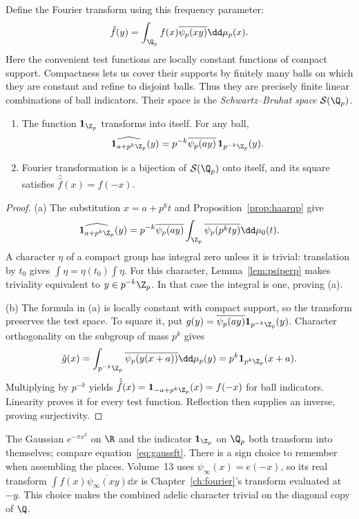Define the Fourier transform using this frequency parameter:
\[\hat f(y)=\int_{\Q_p}f(x)\overline{\psi_p(xy)}\dd\mu_p(x).\]
Here the convenient test functions are locally constant functions of compact support. Compactness lets us cover their supports by finitely many balls on which they are constant and refine to disjoint balls. Thus they are precisely finite linear combinations of ball indicators. Their space is the \emph{Schwartz--Bruhat space} $\mathcal S(\Q_p)$.

\begin{theorem}\label{thm:qpfourier}
\begin{enumerate}
\item[(a)] The function $\mathbf1_{\Z_p}$ transforms into itself. For any ball,
\[\widehat{\mathbf1_{a+p^k\Z_p}}(y)=p^{-k}\overline{\psi_p(ay)}\,\mathbf1_{p^{-k}\Z_p}(y).\]
\item[(b)] Fourier transformation is a bijection of $\mathcal S(\Q_p)$ onto itself, and its square satisfies $\hat{\hat f}(x)=f(-x)$.
\end{enumerate}
\end{theorem}
\begin{proof}
(a) The substitution $x=a+p^kt$ and Proposition~\ref{prop:haarqp} give
\[\widehat{\mathbf1_{a+p^k\Z_p}}(y)
 =p^{-k}\overline{\psi_p(ay)}\int_{\Z_p}\overline{\psi_p(p^kty)}\dd\mu_0(t).
\]
A character $\eta$ of a compact group has integral zero unless it is trivial: translation by $t_0$ gives $\int\eta=\eta(t_0)\int\eta$. For this character, Lemma~\ref{lem:psiperp} makes triviality equivalent to $y\in p^{-k}\Z_p$. In that case the integral is one, proving (a).

(b) The formula in (a) is locally constant with compact support, so the transform preserves the test space. To square it, put $g(y)=\overline{\psi_p(ay)}\mathbf1_{p^{-k}\Z_p}(y)$. Character orthogonality on the subgroup of mass $p^k$ gives
\[\hat g(x)=\int_{p^{-k}\Z_p}\overline{\psi_p(y(x+a))}\dd\mu_p(y)
 =p^k\mathbf1_{p^k\Z_p}(x+a).
\]
Multiplying by $p^{-k}$ yields $\hat{\hat f}(x)=\mathbf1_{-a+p^k\Z_p}(x)=f(-x)$ for ball indicators. Linearity proves it for every test function. Reflection then supplies an inverse, proving surjectivity.
\end{proof}

The Gaussian $e^{-\pi x^2}$ on $\R$ and the indicator $\mathbf1_{\Z_p}$ on $\Q_p$ both transform into themselves; compare equation~\eqref{eq:gaussft}. There is a sign choice to remember when assembling the places. Volume~13 uses $\psi_\infty(x)=e(-x)$, so its real transform $\int f(x)\overline{\psi_\infty(xy)}\dd x$ is Chapter~\ref{ch:fourier}'s transform evaluated at $-y$. This choice makes the combined adelic character trivial on the diagonal copy of $\Q$.

